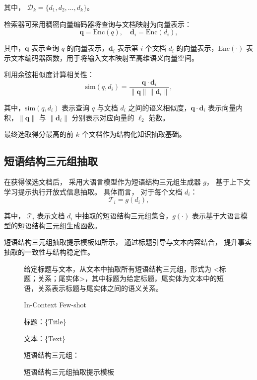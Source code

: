 \noindent 其中，
$\mathcal{D}_k=\{d_1,d_2,\dots,d_k\}$。

检索器可采用稠密向量编码器将查询与文档映射为向量表示：
\begin{equation}
\mathbf{q}=\text{Enc}(q),\quad
\mathbf{d}_i=\text{Enc}(d_i),
\end{equation}

\noindent 其中，$\mathbf{q}$ 表示查询 $q$ 的向量表示，$\mathbf{d}_i$ 表示第 $i$ 个文档 $d_i$ 的向量表示，$\text{Enc}(\cdot)$ 表示文本编码器函数，用于将输入文本映射至高维语义向量空间。

利用余弦相似度计算相关性：
\begin{equation}
\text{sim}(q,d_i)=
\frac{\mathbf{q}\cdot \mathbf{d}_i}
{\|\mathbf{q}\|\|\mathbf{d}_i\|},
\end{equation}

\noindent 其中，$\text{sim}(q,d_i)$ 表示查询 $q$ 与文档 $d_i$ 之间的语义相似度，$\mathbf{q}\cdot \mathbf{d}_i$ 表示向量内积，$\|\mathbf{q}\|$ 与 $\|\mathbf{d}_i\|$ 分别表示对应向量的 $\ell_2$ 范数。

最终选取得分最高的前 $k$ 个文档作为结构化知识抽取基础。

\subsection{短语结构三元组抽取}

在获得候选文档后，
采用大语言模型作为短语结构三元组生成器 $g$，
基于上下文学习提示执行开放式信息抽取。
具体而言，
对于每个文档 $d_i$：
\begin{equation}
\mathcal{T}_i=g(d_i),
\end{equation}

\noindent 其中，
$\mathcal{T}_i$ 表示文档 $d_i$ 中抽取的短语结构三元组集合，$g(\cdot)$ 表示基于大语言模型的短语结构三元组生成函数。

短语结构三元组抽取提示模板如所示，
通过标题引导与文本内容结合，
提升事实抽取的一致性与结构稳定性。

\begin{figure}[htbp]
  \centering
  \begin{minipage}{0.9\textwidth}
  \begin{tcolorbox}[title=短语结构三元组抽取提示模板, fonttitle=\small, fontupper=\small]
  给定标题与文本，从文本中抽取所有短语结构三元组，形式为 
  \textless 标题；关系；尾实体\textgreater，其中标题为给定标题，尾实体为文本中的短语，关系表示标题与尾实体之间的语义关系。

  \vspace{5pt}
  In-Context Few-shot

  \vspace{5pt}
  标题：\{Title\}

  文本：\{Text\}

  短语结构三元组：
  \end{tcolorbox}
  \end{minipage}
  \caption{短语结构三元组抽取提示模板}
  \label{fig:kg_prompt}
\end{figure}

